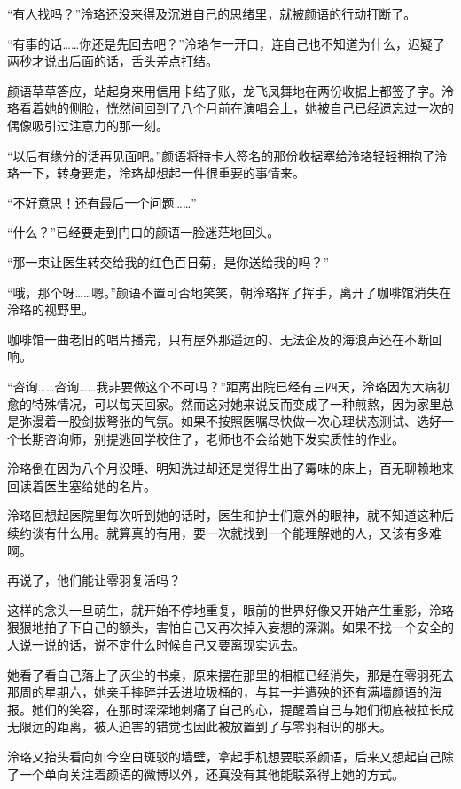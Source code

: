 \documentclass[UTF8, scheme = chinese, openany]{ctexbook}
\begin{document}
“有人找吗？”泠珞还没来得及沉进自己的思绪里，就被颜语的行动打断了。

“有事的话……你还是先回去吧？”泠珞乍一开口，连自己也不知道为什么，迟疑了两秒才说出后面的话，舌头差点打结。

颜语草草答应，站起身来用信用卡结了账，龙飞凤舞地在两份收据上都签了字。泠珞看着她的侧脸，恍然间回到了八个月前在演唱会上，她被自己已经遗忘过一次的偶像吸引过注意力的那一刻。

“以后有缘分的话再见面吧。”颜语将持卡人签名的那份收据塞给泠珞轻轻拥抱了泠珞一下，转身要走，泠珞却想起一件很重要的事情来。

“不好意思！还有最后一个问题……”

“什么？”已经要走到门口的颜语一脸迷茫地回头。

“那一束让医生转交给我的红色百日菊，是你送给我的吗？”

“哦，那个呀……嗯。”颜语不置可否地笑笑，朝泠珞挥了挥手，离开了咖啡馆消失在泠珞的视野里。

咖啡馆一曲老旧的唱片播完，只有屋外那遥远的、无法企及的海浪声还在不断回响。

\vspace{1.5em}

“咨询……咨询……我非要做这个不可吗？”距离出院已经有三四天，泠珞因为大病初愈的特殊情况，可以每天回家。然而这对她来说反而变成了一种煎熬，因为家里总是弥漫着一股剑拔弩张的气氛。如果不按照医嘱尽快做一次心理状态测试、选好一个长期咨询师，别提逃回学校住了，老师也不会给她下发实质性的作业。

泠珞倒在因为八个月没睡、明知洗过却还是觉得生出了霉味的床上，百无聊赖地来回读着医生塞给她的名片。

泠珞回想起医院里每次听到她的话时，医生和护士们意外的眼神，就不知道这种后续约谈有什么用。就算真的有用，要一次就找到一个能理解她的人，又该有多难啊。

再说了，他们能让零羽复活吗？

这样的念头一旦萌生，就开始不停地重复，眼前的世界好像又开始产生重影，泠珞狠狠地拍了下自己的额头，害怕自己又再次掉入妄想的深渊。如果不找一个安全的人说一说的话，说不定什么时候自己又要离现实远去。

她看了看自己落上了灰尘的书桌，原来摆在那里的相框已经消失，那是在零羽死去那周的星期六，她亲手摔碎并丢进垃圾桶的，与其一并遭殃的还有满墙颜语的海报。她们的笑容，在那时深深地刺痛了自己的心，提醒着自己与她们彻底被拉长成无限远的距离，被人迫害的错觉也因此被放置到了与零羽相识的那天。

泠珞又抬头看向如今空白斑驳的墙壁，拿起手机想要联系颜语，后来又想起自己除了一个单向关注着颜语的微博以外，还真没有其他能联系得上她的方式。
\end{document}
